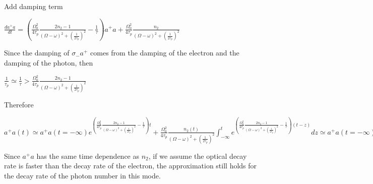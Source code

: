 \documentclass{article}
\begin{document}
\begin{enumerate}
Add damping term

$\frac{d a^+a}{dt} =(  \frac{\Omega_0^2}{4 \tau_p}\frac{2n_2-1}{(\Omega-\omega)^2  +(\frac{1}{2\tau_p})^2} -\frac{1}{\tau})a^+a+\frac{\Omega_0^2}{4 \tau_p}\frac{ n_2}{(\Omega-\omega)^2+(\frac{1}{2\tau_p})^2}$

Since the damping of $\sigma_- a^+$ comes from the damping of the
electron and the damping of the photon, then

$\frac{1}{\tau_p} \simeq \frac{1}{\tau} > \frac{\Omega_0^2}{4 \tau_p}\frac{2n_2-1}{(\Omega-\omega)^2  +(\frac{1}{2\tau_p})^2}$

Therefore

$a^+ a(t)\simeq a^+a(t=-\infty)e^{( \frac{\Omega_0^2}{4 \tau_p}\frac{2n_2-1}{(\Omega-\omega)^2  +(\frac{1}{2\tau_p})^2} -\frac{1}{\tau})t}+\frac{\Omega_0^2}{4 \tau_p}\frac{ n_2(t)}{(\Omega-\omega)^2+(\frac{1}{2\tau_p})^2}\int_{-\infty}^t e^{( \frac{\Omega_0^2}{4 \tau_p}\frac{2n_2-1}{(\Omega-\omega)^2  +(\frac{1}{2\tau_p})^2} -\frac{1}{\tau})(t-z)} dz \simeq a^+a(t=-\infty)e^{ -\frac{1}{\tau}t}+\frac{\Omega_0^2}{4 \tau_p}\frac{ n_2(t)}{(\Omega-\omega)^2+(\frac{1}{2\tau_p})^2} \int_{-\infty}^t e^{  -\frac{1}{\tau}(t-z)} dz \simeq \frac{\Omega_0^2}{4 \tau_p}\frac{ n_2 (t)}{(\Omega-\omega)^2+(\frac{1}{2\tau_p})^2}$

Since $a^+a$ has the same time dependence as $n_2$, if we assume the
optical decay rate is faster than the decay rate of the electron, the
approximation still holds for the decay rate of the photon number in
this mode.

\end{enumerate}


    
    
    
    
\end{document}
